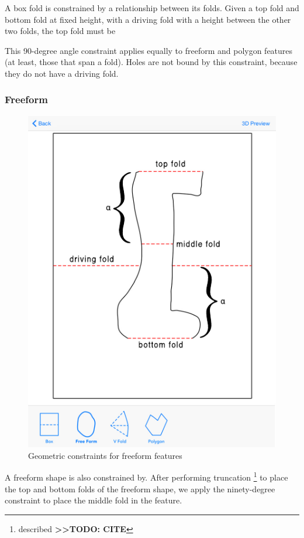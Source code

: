 A box fold is constrained by a relationship between its folds. Given a
top fold and bottom fold at fixed height, with a driving fold with a
height between the other two folds, the top fold must be

This 90-degree angle constraint applies equally to freeform and polygon
features (at least, those that span a fold). Holes are not bound by this
constraint, because they do not have a driving fold.

\subsubsection{Freeform}\label{freeform}

\begin{figure}[htbp]
\centering
\includegraphics{figures/45_Tech_Constraints/freeformConstraints.pdf}
\caption{Geometric constraints for freeform features}
\end{figure}

A freeform shape is also constrained by. After performing truncation
\footnote{described \textbf{\textgreater{}\textgreater{}TODO: CITE}} to
place the top and bottom folds of the freeform shape, we apply the
ninety-degree constraint to place the middle fold in the feature.

